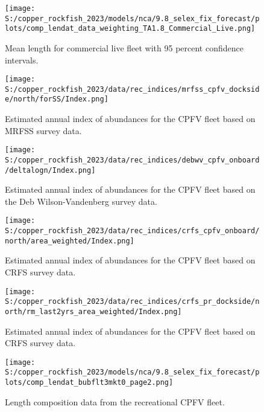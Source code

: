 \documentclass[
  letterpaper,
]{article}
\begin{document}
\pagebreak

\begin{figure}
\centering
\texttt{[image: S:/copper\_rockfish\_2023/models/nca/9.8\_selex\_fix\_forecast/plots/comp\_lendat\_data\_weighting\_TA1.8\_Commercial\_Live.png]}
\caption{Mean length for commercial live fleet with 95 percent confidence intervals.\label{fig:mean-com-live-len-data}}
\end{figure}

\pagebreak

\begin{figure}
\centering
\texttt{[image: S:/copper\_rockfish\_2023/data/rec\_indices/mrfss\_cpfv\_dockside/north/forSS/Index.png]}
\caption{Estimated annual index of abundances for the CPFV fleet based on MRFSS survey data.\label{fig:mrfss-index-main}}
\end{figure}

\pagebreak

\begin{figure}
\centering
\texttt{[image: S:/copper\_rockfish\_2023/data/rec\_indices/debwv\_cpfv\_onboard/deltalogn/Index.png]}
\caption{Estimated annual index of abundances for the CPFV fleet based on the Deb Wilson-Vandenberg survey data.\label{fig:dwv-index-main}}
\end{figure}

\pagebreak

\begin{figure}
\centering
\texttt{[image: S:/copper\_rockfish\_2023/data/rec\_indices/crfs\_cpfv\_onboard/north/area\_weighted/Index.png]}
\caption{Estimated annual index of abundances for the CPFV fleet based on CRFS survey data.\label{fig:crfs-index-main}}
\end{figure}

\pagebreak

\begin{figure}
\centering
\texttt{[image: S:/copper\_rockfish\_2023/data/rec\_indices/crfs\_pr\_dockside/north/rm\_last2yrs\_area\_weighted/Index.png]}
\caption{Estimated annual index of abundances for the CPFV fleet based on CRFS survey data.\label{fig:crfs-pr-index-main}}
\end{figure}

\pagebreak

\begin{figure}
\centering
\texttt{[image: S:/copper\_rockfish\_2023/models/nca/9.8\_selex\_fix\_forecast/plots/comp\_lendat\_bubflt3mkt0\_page2.png]}
\caption{Length composition data from the recreational CPFV fleet.\label{fig:rec-cpfv-len-data}}
\end{figure}
\end{document}
